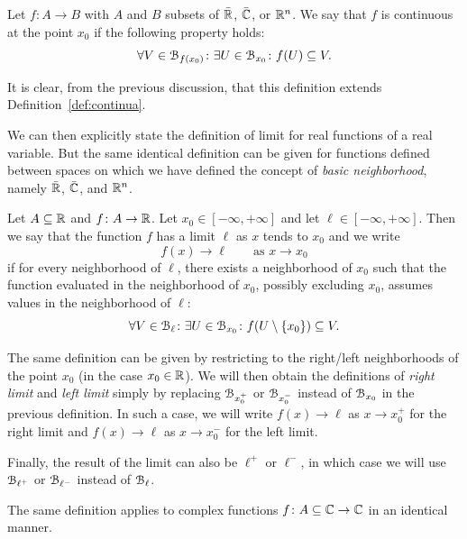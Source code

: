 \begin{definition}
  \label{def:continua_intorni}
  Let $f\colon A\to B$ with $A$ and $B$ subsets of $\bar {{\mathbb R}}$, $\bar {{\mathbb C}}$, 
  or ${\mathbb R}^n$. 
    We say that $f$ is continuous at the point $x_0$ if the following property
  holds:
  \[
    \forall V \in \mathcal B_{f(x_0)} \colon \exists U \in \mathcal B_{x_0} \colon f(U) \subseteq V.
  \]

  It is clear, from the previous discussion, that this definition 
  extends Definition~\ref{def:continua}.
\end{definition}

We can then explicitly state the definition of limit for real functions 
of a real variable. 
But the same identical definition can be given for functions defined 
between spaces on which we have defined the concept of \emph{basic
neighborhood},
namely $\bar {{\mathbb R}}$, $\bar {{\mathbb C}}$, and ${\mathbb R}^n$.

\begin{definition}
\mymark{***}
Let $A\subseteq {\mathbb R}$ and $f\colon A \to {\mathbb R}$.
Let $x_0\in [-\infty,+\infty]$
and let $\ell \in [-\infty,+\infty]$.
Then we say that the function $f$ has a limit $\ell$ as $x$ tends to $x_0$ 
and we write%
\[
  f(x) \to \ell \qquad \text{as $x\to x_0$}
\]
if for every neighborhood of $\ell$, there exists a neighborhood of $x_0$ such
that
the function evaluated in the neighborhood of $x_0$, possibly excluding $x_0$,
assumes values
in the neighborhood of $\ell$:
\begin{equation}\label{eq:def_limite}
  \forall V \in \mathcal B_\ell \colon \exists U \in \mathcal B_{x_0} \colon f(U\setminus{\left\{ x_0 \right\}}) \subseteq V.
\end{equation}

The same definition can be given by restricting to the right/left neighborhoods
of the point $x_0$ (in the case $x_0 \in {\mathbb R}$). We will then obtain the
definitions
of \emph{right limit} and \emph{left limit}
%
simply by replacing $\mathcal B_{x_0^+}$ or $\mathcal B_{x_0^-}$ instead of 
$\mathcal B_{x_0}$ in the previous definition.
In such a case, we will write $f(x)\to \ell$ as $x\to x_0^+$ for the right limit
and $f(x)\to \ell$ as $x\to x_0^-$ for the left limit.

Finally, the result of the limit can also be $\ell^+$ or $\ell^-$, 
in which case we will use $\mathcal B_{\ell^+}$ or $\mathcal B_{\ell^-}$ 
instead of $\mathcal B_{\ell}$.

The same definition applies to complex functions $f\colon A\subseteq {\mathbb C} \to {\mathbb C}$ 
in an identical manner.
\end{definition}
  
